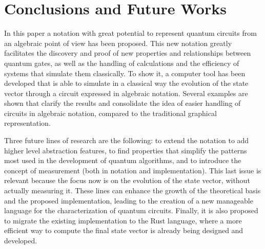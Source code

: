 \documentclass[sigconf,natbib=false]{acmart}
\begin{document}
\section{Conclusions and Future Works}
In this paper a notation with great potential to represent quantum circuits from an algebraic point of view has been proposed. This new notation greatly facilitates the discovery and proof of new properties and relationships between quantum gates, as well as the handling of calculations and the efficiency of systems that simulate them classically. To show it, a computer tool has been developed that is able to simulate in a classical way the evolution of the state vector through a circuit expressed in algebraic notation. Several examples are shown that clarify the results and consolidate the idea of easier handling of circuits in algebraic notation, compared to the traditional graphical representation. %

Three future lines of  research are the following: to extend the notation to add higher level abstraction features, to find properties that simplify the patterns most used in the development of quantum algorithms, and to introduce the concept of measurement (both in notation and implementation).
This last issue is relevant because the focus now is on the evolution of the state vector, without actually measuring it.  These lines can enhance the growth of the theoretical basis and the proposed implementation, leading to the creation of a new manageable language for the characterization of quantum circuits. Finally, it is also proposed to migrate the existing implementation to the Rust language, where a more efficient way to compute the final state vector is already being designed and developed.


\printbibliography
\end{document}
